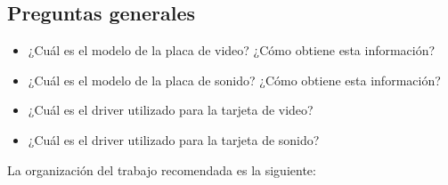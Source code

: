 \documentclass[12pt]{article}
\begin{document}
\subsection*{Preguntas generales}

\begin{itemize}

    \item ¿Cuál es el modelo de la placa de video? ¿Cómo obtiene esta
    información?

    \item ¿Cuál es el modelo de la placa de sonido? ¿Cómo obtiene esta
    información?

    \item ¿Cuál es el driver utilizado para la tarjeta de video?

    \item ¿Cuál es el driver utilizado para la tarjeta de sonido?

\end{itemize}

La organización del trabajo recomendada es la siguiente:
\end{document}
